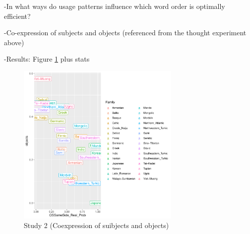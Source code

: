 \documentclass[11pt,a4paper]{article}
\begin{document}
-In what ways do usage patterns influence which word order is optimally efficient?

-Co-expression of subjects and objects (referenced from the thought experiment above)

-Results: Figure \ref{fig:study2} plus stats


\begin{figure}
    \centering
    \includegraphics[width=0.7\textwidth]{figures/objects-order-families.pdf}
    \caption{Study 2 (Coexpression of suibjects and objects)}
    \label{fig:study2}
\end{figure}









\end{document}
